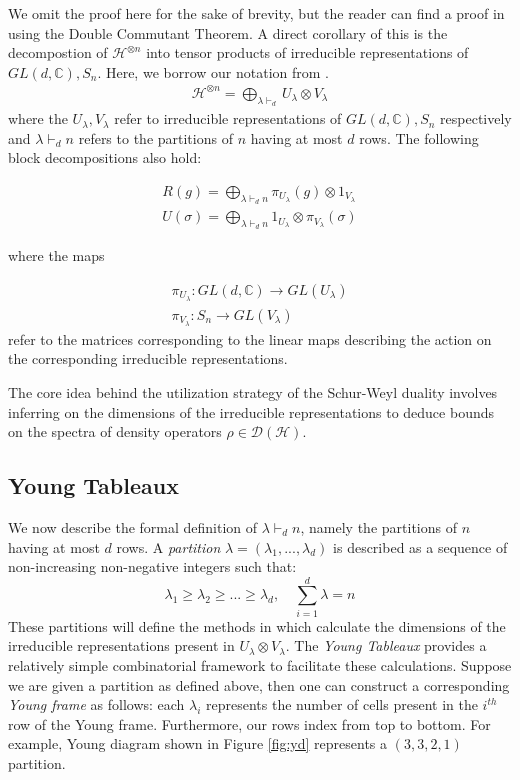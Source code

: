 \documentclass[12pt]{article}%
\begin{document}
We omit the proof here for the sake of brevity, but the reader can find a proof in \cite{GW} using the Double Commutant Theorem. A direct corollary of this is the decompostion of $\mathcal{H}^{\otimes n}$ into tensor products of irreducible representations of $GL(d,\mathbb{C}), S_n$. Here, we borrow our notation from \cite{botero}.
\begin{gather}
  \mathcal{H}^{\otimes n} = \bigoplus_{\lambda \vdash_d } U_\lambda \otimes V_\lambda
\end{gather}
where the $U_\lambda, V_\lambda$ refer to irreducible representations of $GL(d, \mathbb{C}), S_n$ respectively and $\lambda \vdash_d n$ refers to the partitions of $n$ having at most $d$ rows. The following block decompositions also hold:

\begin{gather}\label{matdecomp}
    R(g) = \bigoplus_{\lambda \vdash_d n} \pi_{U_{\lambda}}(g) \otimes 1_{V_{\lambda}} \\
    U(\sigma) = \bigoplus_{\lambda \vdash_d n} 1_{U_{\lambda}} \otimes \pi_{V_{\lambda}}(\sigma)
\end{gather}

\noindent where the maps

\begin{gather*}
  \pi_{U_{\lambda}}: GL(d, \mathbb{C}) \rightarrow GL(U_\lambda) \\ \pi_{V_{\lambda}}: S_n \rightarrow GL(V_\lambda)
\end{gather*} refer to the matrices corresponding to the linear maps describing the action on the corresponding irreducible representations.

The core idea behind the utilization strategy of the Schur-Weyl duality involves inferring on the dimensions of the irreducible representations to deduce bounds on the spectra of density operators $\rho \in \mathcal{D}(\mathcal{H})$.

\subsection{Young Tableaux}
We now describe the formal definition of $\lambda \vdash_d n$, namely the partitions of $n$ having at most $d$ rows. A \textit{partition} $\lambda = (\lambda_1,...,\lambda_d)$ is described as a sequence of non-increasing non-negative integers such that:
$$ \lambda_1 \geq \lambda_2 \geq ... \geq \lambda_d, \quad \sum_{i=1}^d \lambda = n $$
These partitions will define the methods in which calculate the dimensions of the irreducible representations present in $U_\lambda \otimes V_\lambda$.
The \textit{Young Tableaux} provides a relatively simple combinatorial framework to facilitate these calculations. Suppose we are given a partition as defined above, then one can construct a corresponding \textit{Young frame} as follows: each $\lambda_i$ represents the number of cells present in the $i^{th}$ row of the Young frame. Furthermore, our rows index from top to bottom. For example, Young diagram shown in Figure \ref{fig:yd} represents a $(3,3,2,1)$ partition.
\end{document}
